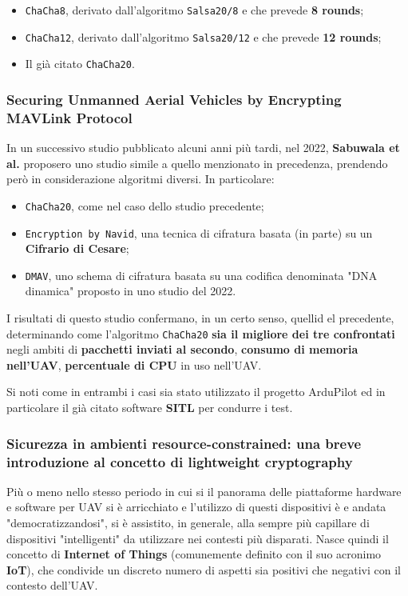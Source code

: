 \documentclass[a4paper, 12pt, oneside]{article}
\theoremstyle{definition}
\begin{document}
\begin{itemize}
    \item \texttt{ChaCha8}, derivato dall'algoritmo \texttt{Salsa20/8} e che prevede \textbf{8 rounds};
    \item \texttt{ChaCha12}, derivato dall'algoritmo \texttt{Salsa20/12} e che prevede \textbf{12 rounds};
    \item Il già citato \texttt{ChaCha20}.
\end{itemize}

\subsubsection{Securing Unmanned Aerial Vehicles by Encrypting MAVLink Protocol}

In un successivo studio \cite{10037546} pubblicato alcuni anni più tardi, nel 2022, \textbf{Sabuwala et al.} proposero uno studio simile a quello menzionato in precedenza, prendendo però in considerazione algoritmi diversi. In particolare:

\begin{itemize}
    \item \texttt{ChaCha20}, come nel caso dello studio precedente;
    \item \texttt{Encryption by Navid}, una tecnica di cifratura basata (in parte) su un \textbf{Cifrario di Cesare};
    \item \texttt{DMAV}, uno schema di cifratura basata su una codifica denominata "DNA dinamica" proposto in uno studio del 2022. 
\end{itemize}

I risultati di questo studio confermano, in un certo senso, quellid el precedente, determinando come l'algoritmo \texttt{ChaCha20} \textbf{sia il migliore dei tre confrontati} negli ambiti di \textbf{pacchetti inviati al secondo}, \textbf{consumo di memoria nell'UAV}, \textbf{percentuale di CPU} in uso nell'UAV.

Si noti come in entrambi i casi sia stato utilizzato il progetto ArduPilot ed in particolare il già citato software \textbf{SITL} per condurre i test.

\subsubsection{Sicurezza in ambienti resource-constrained: una breve introduzione al concetto di lightweight cryptography}
Più o meno nello stesso periodo in cui si il panorama delle piattaforme hardware e software per UAV si è arricchiato e l'utilizzo di questi dispositivi è e andata "democratizzandosi", si è assistito, in generale, alla sempre più capillare di dispositivi "intelligenti" da utilizzare nei contesti più disparati. Nasce quindi il concetto di \textbf{Internet of Things} (comunemente definito con il suo acronimo \textbf{IoT}), che condivide un discreto numero di aspetti sia positivi che negativi con il contesto dell'UAV. 
\end{document}
